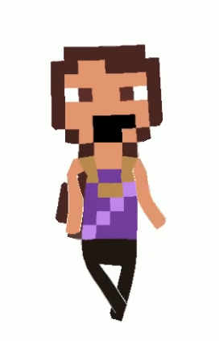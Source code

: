 
\begin{figure}[htbp]
    \centering
    \caption{\small Frames das animações geradas pelo Animated Drawnings 3}
    \label{fig:sketchIrma3Frame}
    \begin{subfigure}{0.2\linewidth}
        \includegraphics[width=1\linewidth]{figs/sketchLab/bracosIguais.PNG}

\end{subfigure}
\end{figure}
